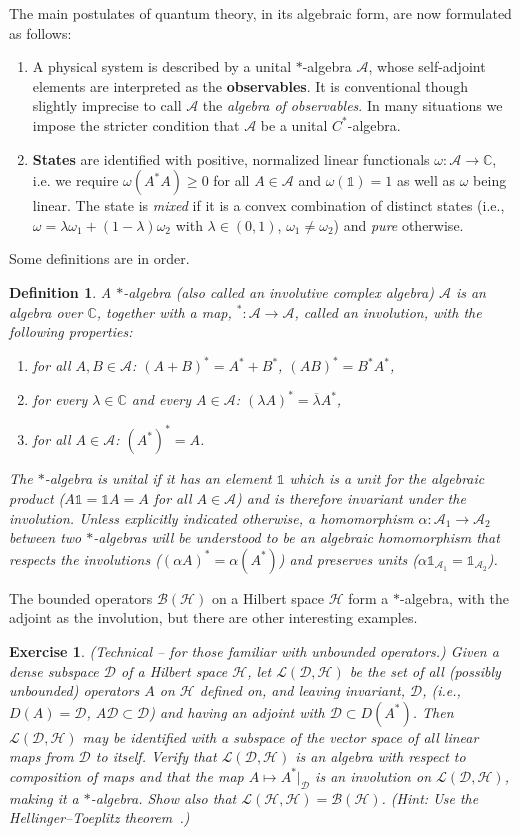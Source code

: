 \documentclass[12pt]{article}
\newcommand{\1}{\mathds{1}}                         %
\newcommand{\CC}{\mathbb{C}}           %
\newcommand{\Hcal}{\mathcal {H}}
\newcommand{\Lcal}{\mathcal {L}}
\newcommand{\Bcal}{\mathcal {B}}
\newcommand{\C}{\mathbb{C}}
\newcommand{\BB}{{\mathcal{B}}}
\newcommand{\HH}{{\mathcal{H}}}
\newcommand{\DD}{{\mathscr{D}}}
\newcommand{\II}{{\mathbb{1}}}
\newcommand{\Ac}{{\mathcal{A}}}
\newtheorem{exercise}[theorem]{Exercise}
\newtheorem{df}[theorem]{Definition}}
\begin{document}
The main postulates of quantum theory, in its algebraic form, are now formulated as follows: 
\begin{enumerate}
	\item A physical system is described by a unital $*$-algebra $\Ac$, 
	whose self-adjoint elements are interpreted as the \textbf{observables}. It is conventional though slightly imprecise to call $\Ac$ the \textit{algebra of observables}.
	In many situations we impose the stricter condition that $\Ac$ be a unital $C^*$-algebra.
	\item \textbf{States} are identified with positive, normalized linear functionals  $\omega:\Ac\to\CC$, i.e. we require $\omega(A^*A)\geq 0$ for all $A\in\Ac$ and $\omega(\1)=1$ as well as $\omega$ being linear. The state is
	\emph{mixed} if it is a convex combination of distinct states (i.e., $\omega=\lambda\omega_1+(1-\lambda)\omega_2$ with $\lambda\in(0,1)$, $\omega_1\neq \omega_2$) and \emph{pure} otherwise. 
\end{enumerate}
Some definitions are in order. 
\begin{df}
	A \emph{$*$-algebra} (also called an involutive complex algebra) $\Ac$ is an algebra over $\C$, together with a map, ${}^*:\Ac \rightarrow \Ac$, called an involution, with the following properties:
	\begin{enumerate}
		\item    for all $A, B \in \Ac$: $(A + B)^* = A^* + B^*$, $(A B)^* = B^* A^*$,
		\item   for every $\lambda\in\CC$ and every $A \in \Ac$: $(\lambda A)^* = \overline{\lambda} A^*$,
		\item    for all $A \in \Ac$: $(A^*)^* = A$.
	\end{enumerate}
	The $*$-algebra is \emph{unital} if it has an element $\II$ which is a unit for the algebraic product ($A\II=\II A=A$ for all $A\in\Ac$) and is therefore invariant under the involution. Unless explicitly indicated otherwise, a homomorphism $\alpha:\Ac_1\to\Ac_2$ between two $*$-algebras will be understood to be an algebraic homomorphism that respects the involutions ($(\alpha A)^*=\alpha (A^*)$) and preserves units ($\alpha \II_{\Ac_1}=\II_{\Ac_2}$).  
\end{df}
 The bounded operators $\Bcal(\Hcal)$ on a Hilbert space $\Hcal$ form a $*$-algebra, with the adjoint as the involution, but there are other interesting examples. 
\begin{exercise}\label{ex:LDH}
(Technical -- for those familiar with unbounded operators.) Given a dense subspace $\DD$ of a Hilbert space $\HH$, let $\Lcal(\DD,\HH)$
be the set of all (possibly unbounded) operators $A$ on $\HH$ defined on, and leaving invariant, $\DD$, (i.e., $D(A)=\DD$, $A\DD\subset\DD$) and having an adjoint with $\DD\subset D(A^*)$. Then $\Lcal(\DD,\HH)$ may be identified with a subspace of the vector space of all linear maps from $\DD$ to itself. Verify that $\Lcal(\DD,\HH)$ is an algebra with respect to composition of maps and that the map $A\mapsto A^*|_\DD$ is an involution on $\Lcal(\DD,\HH)$, making it a $*$-algebra. Show also that $\Lcal(\HH,\HH)=\BB(\HH)$. (Hint: Use the Hellinger--Toeplitz theorem~\cite[\S III.5]{ReedSimon:vol1}.)
\end{exercise}  
\end{document}

